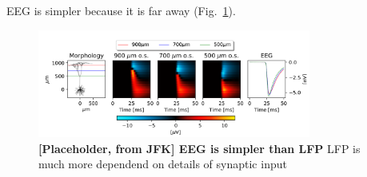 \subsection{}
EEG is simpler because it is far away (Fig.~\ref{EEG:fig:simple_EEG}).
\begin{figure}[!ht]
\begin{center}
\includegraphics[width=0.8\textwidth]{Figures/EEG/EEG_is_simple.png}
\end{center}
\caption{\textbf{[Placeholder, from JFK] EEG is simpler than LFP} 
LFP is much more dependend on details of synaptic input
}
\label{EEG:fig:simple_EEG}
\end{figure}



\subsection{ }
